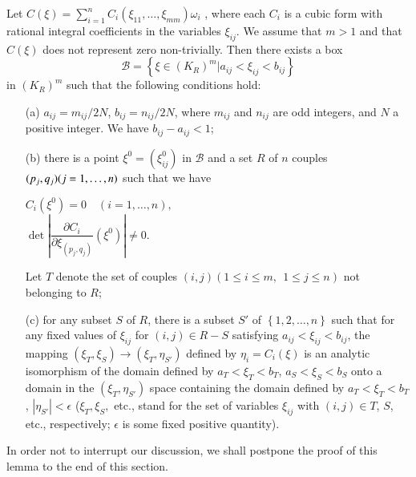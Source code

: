 \begin{lemma} %
Let $C (\xi) = \sum\limits^{n}_{i=1} C_i (\xi_{11}, \ldots, \xi_{mm})\omega_i$ , where each $C_i$ is a cubic form with rational integral coefficients in the variables $\xi_{ij}$. We assume that $m>1$ and that $C(\xi)$ does not represent zero non-trivially. Then there exists a box
$$
\mathscr{B} = \left\{\xi \in (K_R)^m | a_{ij} < \xi_{ij} < b_{ij} \right\}
$$
in $(K_R)^m$ such that the following conditions hold:
\begin{itemize}
\item[(a)] $a_{ij} = m_{ij}/2 N$, $b_{ij} = n_{ij}/2 N$, where $m_{ij}$ and $n_{ij}$ are odd integers, and $N$ a positive integer. We have $b_{ij} - a_{ij} <1$;

\item[(b)] there is a point $\xi^0 = (\xi^0_{ij})$ in $\mathscr{B}$ and a set $R$ of $n$ couples $(p_j, q_j)\break (j=1, \ldots, n)$ such that we have 
\begin{center}
$C_i (\xi^0) = 0  \quad (i = 1, \ldots, n),$\\[0.4cm    ]
$\det \left|\dfrac{\partial C_i}{\partial \xi_{(p_j, q_j)}} (\xi^0) \right|  \neq 0$.
\end{center}

Let $T$ denote the set of couples $(i, j) (1\leq i \leq m, ~~1 \leq j \leq n)$ not belonging to $R$;

\item[(c)] for any subset $S$ of $R$, there is a subset $S'$ of $\left\{1, 2, \ldots, n \right\}$ such that for any fixed values of $\xi_{ij}$ for $(i,j) \in R -S$ satisfying $a_{ij} 
< \xi_{ij} < b_{ij}$, the mapping $(\xi_T, \xi_S) \to (\xi_T, \eta_{S'})$ defined by $\eta_i = C_i(\xi)$ is an analytic isomorphism of the domain defined by $a_T < \xi_T < b_T$, $a_S < \xi_S < b_S$ onto a domain in the $(\xi_T, \eta_{S'})$ space containing the domain defined by $a_T < \xi_T < b_T$, $|\eta_{S'}| < \epsilon$ ($\xi_T, \xi_S,$ etc., stand for the set of variables $\xi_{ij}$ with $(i,j) \in T$, $S$, etc., respectively; $\epsilon$ is some fixed positive quantity).
\end{itemize}
\end{lemma}

In order not to interrupt our discussion, we shall postpone the proof of this lemma to the end of this section.

